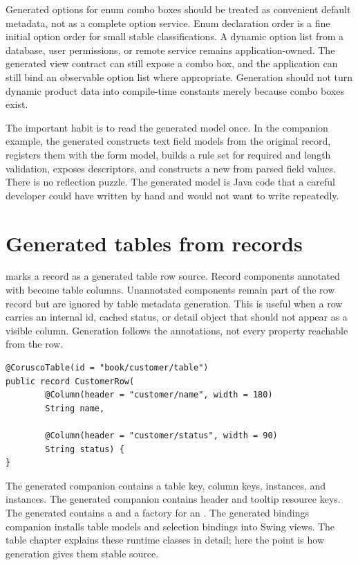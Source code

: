 Generated options for enum combo boxes should be treated as convenient default
metadata, not as a complete option service. Enum declaration order is a fine
initial option order for small stable classifications. A dynamic option list
from a database, user permissions, or remote service remains application-owned.
The generated view contract can still expose a combo box, and the application
can still bind an observable option list where appropriate. Generation should
not turn dynamic product data into compile-time constants merely because
combo boxes exist.

The important habit is to read the generated model once. In the companion
example, the generated  constructs text field
models from the original record, registers them with the form model, builds a
rule set for required and length validation, exposes descriptors, and
constructs a new  from parsed field values. There is no
reflection puzzle. The generated model is Java code that a careful developer
could have written by hand and would not want to write repeatedly.

\section{Generated tables from records}

 marks a record as a generated table row source. Record
components annotated with  become table columns. Unannotated
components remain part of the row record but are ignored by table metadata
generation. This is useful when a row carries an internal id, cached status,
or detail object that should not appear as a visible column. Generation
follows the annotations, not every property reachable from the row.

\begin{lstlisting}[caption={Annotated table source used by the companion example.}]
@CoruscoTable(id = "book/customer/table")
public record CustomerRow(
        @Column(header = "customer/name", width = 180)
        String name,

        @Column(header = "customer/status", width = 90)
        String status) {
}
\end{lstlisting}

The generated  companion contains a table key, column
keys,  instances, and  instances. The
generated  companion contains header and
tooltip resource keys. The generated 
contains a  and a factory for an
. The generated bindings companion installs table
models and selection bindings into Swing views. The table chapter explains
these runtime classes in detail; here the point is how generation gives them
stable source.


